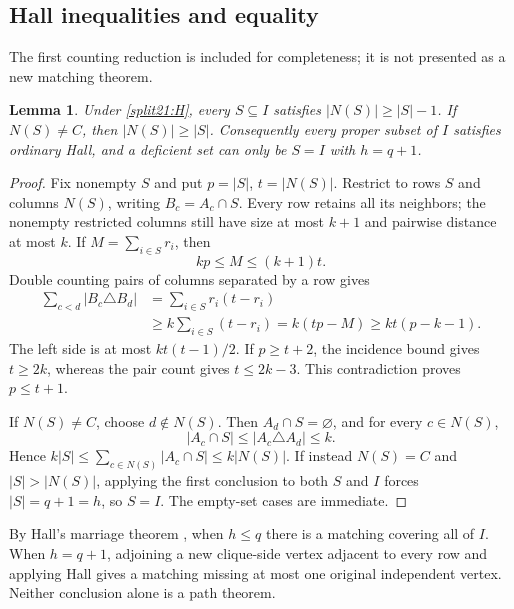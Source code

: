 \documentclass[11pt,a4paper]{article}
\newtheorem{lemma}[theorem]{Lemma}
\theoremstyle{definition}\newtheorem{definition}[theorem]{Definition}
\theoremstyle{remark}\newtheorem{remark}[theorem]{Remark}
\begin{document}
\subsection{Hall inequalities and equality}

The first counting reduction is included for completeness; it is not
presented as a new matching theorem.

\begin{lemma}\label{split21:almost}
Under \eqref{split21:H}, every $S\subseteq I$ satisfies $|N(S)|\geq|S|-1$.
If $N(S)\ne C$, then $|N(S)|\geq|S|$.
Consequently every proper subset of $I$ satisfies ordinary Hall, and a
deficient set can only be $S=I$ with $h=q+1$.
\end{lemma}
\begin{proof}
Fix nonempty $S$ and put $p=|S|$, $t=|N(S)|$. Restrict to rows $S$ and
columns $N(S)$, writing $B_c=A_c\cap S$. Every row retains all its neighbors;
the nonempty restricted columns still have size at most $k+1$ and pairwise
distance at most $k$. If $M=\sum_{i\in S}r_i$, then
\[
 kp\leq M\leq(k+1)t.
\]
Double counting pairs of columns separated by a row gives
\begin{align*}
\sum_{c<d}|B_c\triangle B_d|
 &=\sum_{i\in S}r_i(t-r_i)\\
 &\geq k\sum_{i\in S}(t-r_i)
 =k(tp-M)\geq kt(p-k-1).
\end{align*}
The left side is at most $kt(t-1)/2$. If $p\geq t+2$, the incidence
bound gives $t\geq2k$, whereas the pair count gives $t\leq2k-3$.
This contradiction proves $p\leq t+1$.

If $N(S)\ne C$, choose $d\notin N(S)$. Then $A_d\cap S=\varnothing$,
and for every $c\in N(S)$,
\[
 |A_c\cap S|\leq|A_c\triangle A_d|\leq k.
\]
Hence $k|S|\leq\sum_{c\in N(S)}|A_c\cap S|\leq k|N(S)|$.
If instead $N(S)=C$ and $|S|>|N(S)|$, applying the first conclusion to
both $S$ and $I$ forces $|S|=q+1=h$, so $S=I$.
The empty-set cases are immediate.
\end{proof}

By Hall's marriage theorem \cite{src:hall}, when $h\leq q$ there is a matching
covering all of $I$. When $h=q+1$, adjoining a new clique-side vertex
adjacent to every row and applying Hall gives a matching missing at most
one original independent vertex. Neither conclusion alone is a path theorem.
\end{document}
